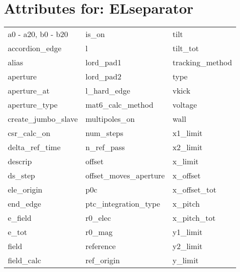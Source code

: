  \section{Attributes for: ELseparator}
 \label{s:list.elseparator}
 
 \begin{tabular}{lll} \toprule
a0 - a20, b0 - b20          & is_on                       & tilt                        \\
accordion_edge              & l                           & tilt_tot                    \\
alias                       & lord_pad1                   & tracking_method             \\
aperture                    & lord_pad2                   & type                        \\
aperture_at                 & l_hard_edge                 & vkick                       \\
aperture_type               & mat6_calc_method            & voltage                     \\
create_jumbo_slave          & multipoles_on               & wall                        \\
csr_calc_on                 & num_steps                   & x1_limit                    \\
delta_ref_time              & n_ref_pass                  & x2_limit                    \\
descrip                     & offset                      & x_limit                     \\
ds_step                     & offset_moves_aperture       & x_offset                    \\
ele_origin                  & p0c                         & x_offset_tot                \\
end_edge                    & ptc_integration_type        & x_pitch                     \\
e_field                     & r0_elec                     & x_pitch_tot                 \\
e_tot                       & r0_mag                      & y1_limit                    \\
field                       & reference                   & y2_limit                    \\
field_calc                  & ref_origin                  & y_limit                     \\

\end{tabular}

